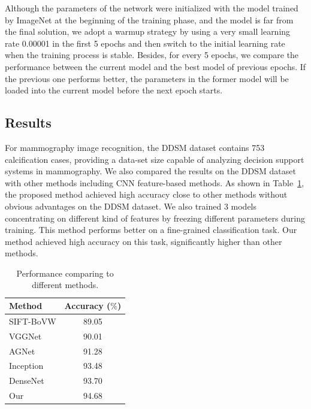 \documentclass[12pt]{article}
\begin{document}
Although the parameters of the network 
were initialized with the model trained by 
ImageNet at the beginning of the training 
phase, and the model is far from the final 
solution, we adopt a warmup strategy by using 
a very small learning rate 0.00001 in the 
first 5 epochs and then switch to the 
initial learning rate when the training 
process is stable. Besides, for every 5 
epochs, we compare the performance between 
the current model and the best model of 
previous epochs. If the previous one 
performs better, the parameters in the 
former model will be loaded into the 
current model before the next epoch starts.

\subsection{Results}
\label{sec:ExpRes}

For mammography image recognition, the DDSM 
dataset contains 753 calcification cases, 
providing a data-set size capable of 
analyzing decision support systems in 
mammography. We also compared the results 
on the DDSM dataset with other methods 
including CNN feature-based methods. 
As shown in 
Table~\ref{tab:tabPerf},
the proposed method achieved high accuracy 
close to other methods without obvious 
advantages on the DDSM dataset. We also trained 
3 models concentrating on different kind
of features by freezing different 
parameters during training. This method 
performs better on a fine-grained 
classification task. Our method achieved 
high accuracy on this task, significantly 
higher than other methods.


\begin{table}[ht]
\renewcommand{\arraystretch}{1.3}
\caption{Performance comparing to 
different methods.}
\label{tab:tabPerf}
\begin{center}
\begin{tabular}{|l|c|}
  \hline
        Method & Accuracy ($\%$) \\
        \hline
        SIFT-BoVW       & 89.05 \\
        VGGNet          & 90.01 \\
        AGNet           & 91.28 \\
        Inception       & 93.48 \\
        DenseNet        & 93.70 \\
        Our             & 94.68 \\
        \hline
\end{tabular}
\end{center}
\end{table}
\end{document}
